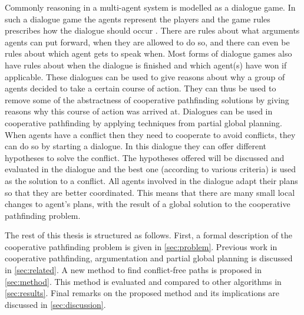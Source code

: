 Commonly reasoning in a multi-agent system is modelled as a dialogue game. In
such a dialogue game the agents represent the players and the game rules
prescribes how the dialogue should occur \cite{walton1995}. There are rules
about what arguments agents can put forward, when they are allowed to do so,
and there can even be rules about which agent gets to speak when. Most forms of
dialogue games also have rules about when the dialogue is finished and which
agent(s) have won if applicable. These dialogues can be used to give reasons
about why a group of agents decided to take a certain course of action. They
can thus be used to remove some of the abstractness of cooperative pathfinding
solutions by giving reasons why this course of action was arrived at.
%
Dialogues can be used in cooperative pathfinding by applying techniques from
partial global planning. When agents have a conflict then they need to
cooperate to avoid conflicts, they can do so by starting a dialogue. In this
dialogue they can offer different hypotheses to solve the conflict. The
hypotheses offered will be discussed and evaluated in the dialogue and the best
one (according to various criteria) is used as the solution to a conflict. All
agents involved in the dialogue adapt their plans so that they are better
coordinated. This means that there are many small local changes to agent's
plans, with the result of a global solution to the cooperative pathfinding
problem.

The rest of this thesis is structured as follows. First, a formal description
of the cooperative pathfinding problem is given in \autoref{sec:problem}.
Previous work in cooperative pathfinding, argumentation and partial global
planning is discussed in \autoref{sec:related}. A new method to find
conflict-free paths is proposed in \autoref{sec:method}. This method is
evaluated and compared to other algorithms in \autoref{sec:results}. Final
remarks on the proposed method and its implications are discussed in
\autoref{sec:discussion}.
